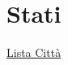 \section{Stati}\label{stati}

\href{Lista\%20Citta\%CC\%80\%20ab26039bdd124b2da3e5f7ba0c5e4a61.csv}{Lista
Città}
